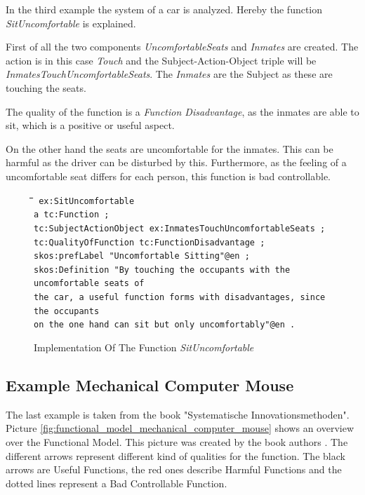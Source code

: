 \documentclass[11pt,a4paper]{article}
\newenvironment{code}{\tt \begin{tabbing}
\hskip12pt\=\hskip12pt\=\hskip12pt\=\hskip12pt\=\hskip5cm\=\hskip5cm\=\kill}
{\end{tabbing}}
\begin{document}
In the third example the system of a car is analyzed.  Hereby the function
\emph{SitUncomfortable} is explained.

First of all the two components \emph{UncomfortableSeats} and \emph{Inmates}
are created.  The action is in this case \emph{Touch} and the
Subject-Action-Object triple will be \emph{InmatesTouchUncomfortableSeats}.
The \emph{Inmates} are the Subject as these are touching the seats.

The quality of the function is a \emph{Function Disadvantage}, as the inmates
are able to sit, which is a positive or useful aspect.

On the other hand the seats are uncomfortable for the inmates.  This can be
harmful as the driver can be disturbed by this.  Furthermore, as the feeling
of a uncomfortable seat differs for each person, this function is bad
controllable.
\begin{figure}[ht]
  \centering
  \begin{code}\tt
    ex:SitUncomfortable\\
    \> a tc:Function ;\\
    \> tc:SubjectActionObject ex:InmatesTouchUncomfortableSeats ;\\
    \> tc:QualityOfFunction tc:FunctionDisadvantage ;\\
    \> skos:prefLabel "Uncomfortable Sitting"@en ;\\
    \> skos:Definition "By touching the occupants with the uncomfortable seats
    of\\ 
    \> \> the car, a useful function forms with disadvantages, since the
    occupants\\ 
    \> \> on the one hand can sit but only uncomfortably"@en .
  \end{code}
  \caption{Implementation Of The Function \emph{SitUncomfortable}}
  \label{fig:implementation_function_sit_uncomfortable}
\end{figure}

\subsection{Example Mechanical Computer Mouse}

The last example is taken from the book "Systematische Innovationsmethoden".
Picture \ref{fig:functional_model_mechanical_computer_mouse} shows an overview
over the Functional Model.  This picture was created by the book authors
\cite{KS}.  The different arrows represent different kind of qualities for the
function.  The black arrows are Useful Functions, the red ones describe
Harmful Functions and the dotted lines represent a Bad Controllable Function.
\end{document}
